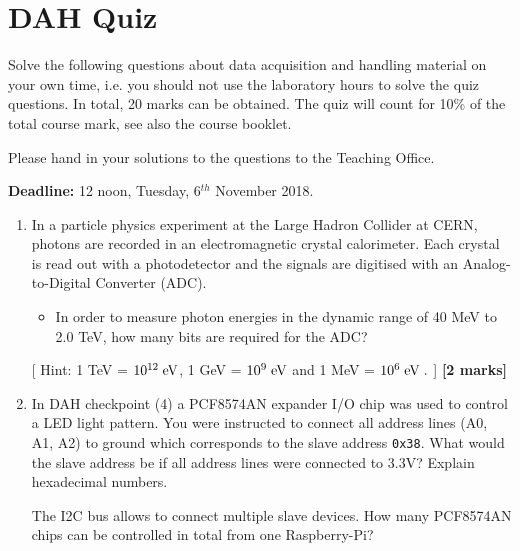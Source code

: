 \chapter{DAH Quiz}
\label{sec:quiz}

Solve the following questions about data acquisition and handling material on your own time,
i.e. you should not use the laboratory hours to solve the quiz questions. 
In total, 20 marks can be obtained.
The quiz will count for 10\% of the total course mark, see also the course booklet. 

Please hand in your solutions to the questions to the Teaching Office.

{\bf Deadline:} 12 noon, Tuesday, 6$^{th}$ November 2018.

\begin{enumerate}

\item  In a particle physics experiment at the Large Hadron Collider at CERN, photons  are recorded in an electromagnetic crystal calorimeter. Each crystal is read out with a photodetector and the signals
are  digitised with an Analog-to-Digital Converter (ADC).
%
\begin{itemize}
\item In order to measure photon  energies  in  the dynamic range of 40 MeV to  2.0 TeV,
how many bits are required for the ADC? 
\end{itemize}
[ Hint: 1 TeV = $10^{12}\; \rm eV$, 1 GeV = $10^9\; \rm eV$ and 1 MeV = $10^6\; \rm eV\; .$ ]
%
\hfill {\bf [2 marks]}\\

\item In DAH checkpoint (4) a PCF8574AN expander I/O chip was used to control a LED light pattern.  You were instructed to connect all address lines (A0, A1, A2) to ground which corresponds to the slave address {\tt 0x38}. What would the slave address be  if all address lines were connected to 3.3V?
Explain hexadecimal numbers. 

The I2C bus allows to connect multiple slave devices. How many PCF8574AN chips can be controlled in total from one Raspberry-Pi?


\end{enumerate}
